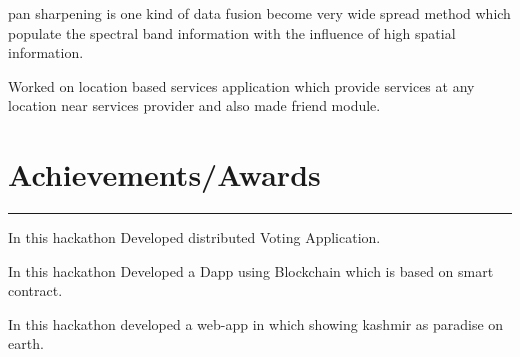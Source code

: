 \documentclass[]{meetresume-class}
\begin{document}
\begin{minipage}[t]{0.66\textwidth}
		 
		\noindent
		\hspace{5em}%
		\begin{minipage}{0.85\textwidth\vspace{2pt}}
			pan sharpening is one kind of data fusion become very wide spread method which populate the spectral band information with the influence of high spatial information.
		\end{minipage}
		\sectionsep
		
		 
		\noindent
		\hspace{5em}%
		\begin{minipage}{0.85\textwidth\vspace{2pt}}
			Worked on location based services application which provide services at any location near
			services provider and also made friend module.
		\end{minipage}
		\section{Achievements/Awards} 
		\noindent\rule{12.5cm}{0.4pt}
		 
		\noindent
		\hspace{5em}%
		\begin{minipage}{0.85\textwidth\vspace{2pt}}
			In this hackathon Developed distributed Voting Application.
		\end{minipage}
		 
		\noindent
		\hspace{5em}%
		\begin{minipage}{0.85\textwidth\vspace{2pt}}
			In this hackathon Developed a Dapp using Blockchain which is based on smart contract.
		\end{minipage}
		 
		\noindent
		\hspace{5em}%
		\begin{minipage}{0.85\textwidth\vspace{2pt}}
			In this hackathon developed a web-app in which showing kashmir as paradise on earth.
		\end{minipage}

\end{minipage}
\end{document}
